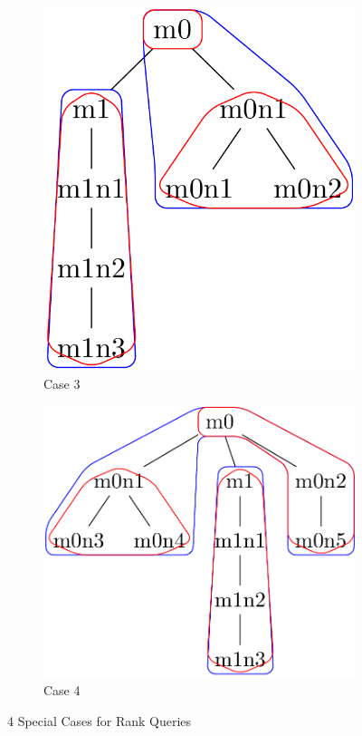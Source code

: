 \documentclass{article}
\begin{document}
\begin{figure}[ht]
\begin{subfigure}{3cm}
		\includegraphics[scale=0.2]{F4C3Tree}
		\caption{Case 3}
		\label{rank:subim3}
	\end{subfigure}
	\begin{subfigure}{3cm}
		\includegraphics[scale=0.2]{F4C4Tree}
		\caption{Case 4}
		\label{rank:subim4}
	\end{subfigure}

\caption{4 Special Cases for Rank Queries}
\label{rank:images4}
\end{figure}
\end{document}
